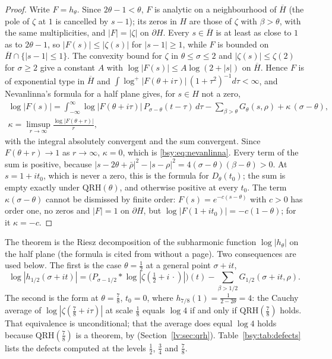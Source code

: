 \begin{proof}
Write $F=h_\theta$. Since $2\theta-1<\theta$, $F$ is analytic on a neighbourhood of $\overline H$ (the pole of $\zeta$ at $1$ is cancelled by $s-1$); its zeros in $H$ are those of $\zeta$ with $\beta>\theta$, with the same multiplicities, and $|F|=|\zeta|$ on $\partial H$. Every $s\in\overline H$ is at least as close to $1$ as to $2\theta-1$, so $|F(s)|\le|\zeta(s)|$ for $|s-1|\ge1$, while $F$ is bounded on $\overline H\cap\{|s-1|\le1\}$. The convexity bound for $\zeta$ in $\theta\le\sigma\le2$ \cite[Chapter V]{Titchmarsh} and $|\zeta(s)|\le\zeta(2)$ for $\sigma\ge2$ give a constant $A$ with $\log|F(s)|\le A\log(2+|s|)$ on $\overline H$. Hence $F$ is of exponential type in $\overline H$ and $\int\log^+|F(\theta+i\tau)|\,(1+\tau^2)^{-1}d\tau<\infty$, and Nevanlinna's formula for a half plane \cite{Levin96} gives, for $s\in H$ not a zero,
\[
\begin{gathered}
\log|F(s)|=\int_{-\infty}^{\infty}\log|F(\theta+i\tau)|\,P_{\sigma-\theta}(t-\tau)\,d\tau-\sum_{\beta>\theta}G_\theta(s,\rho)+\kappa\,(\sigma-\theta),\\
\kappa=\limsup_{r\to\infty}\frac{\log|F(\theta+r)|}{r},
\end{gathered}
\]
with the integral absolutely convergent and the sum convergent. Since $F(\theta+r)\to1$ as $r\to\infty$, $\kappa=0$, which is \eqref{bsy:eq:nevanlinna}. Every term of the sum is positive, because $|s-2\theta+\bar\rho|^2-|s-\rho|^2=4(\sigma-\theta)(\beta-\theta)>0$. At $s=1+it_0$, which is never a zero, this is the formula for $D_\theta(t_0)$; the sum is empty exactly under $\mathrm{QRH}(\theta)$, and otherwise positive at every $t_0$. The term $\kappa(\sigma-\theta)$ cannot be dismissed by finite order: $F(s)=e^{-c(s-\theta)}$ with $c>0$ has order one, no zeros and $|F|=1$ on $\partial H$, but $\log|F(1+it_0)|=-c(1-\theta)$; for it $\kappa=-c$.
\end{proof}

The theorem is the Riesz decomposition of the subharmonic function $\log|h_\theta|$ on the half plane (the formula is cited from \cite{Levin96} without a page). Two consequences are used below. The first is the case $\theta=\frac12$ at a general point $\sigma+it$,
\begin{equation}\label{bsy:eq:riesz}
\log|h_{1/2}(\sigma+it)|=\bigl(P_{\sigma-1/2}*\log|\zeta(\tfrac12+i\,\cdot)|\bigr)(t)-\sum_{\beta>1/2}G_{1/2}(\sigma+it,\rho).
\end{equation}
The second is the form at $\theta=\frac78$, $t_0=0$, where $h_{7/8}(1)=\frac1{2-2\theta}=4$: the Cauchy average of $\log|\zeta(\frac78+i\tau)|$ at scale $\frac18$ equals $\log4$ if and only if $\mathrm{QRH}(\frac78)$ holds. That equivalence is unconditional; that the average does equal $\log4$ holds because $\mathrm{QRH}(\frac78)$ is a theorem, by \cite{OAI26a} (Section~\ref{lv:sec:qrh}). Table~\ref{bsy:tab:defects} lists the defects computed at the levels $\frac12$, $\frac34$ and $\frac78$.

